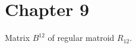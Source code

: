 \section{Chapter 9}

\begin{proposition}[9.2.14]
  \label{prop:9.2.14}
  Matrix $B^{12}$ of regular matroid $R_{12}$.
\end{proposition}
